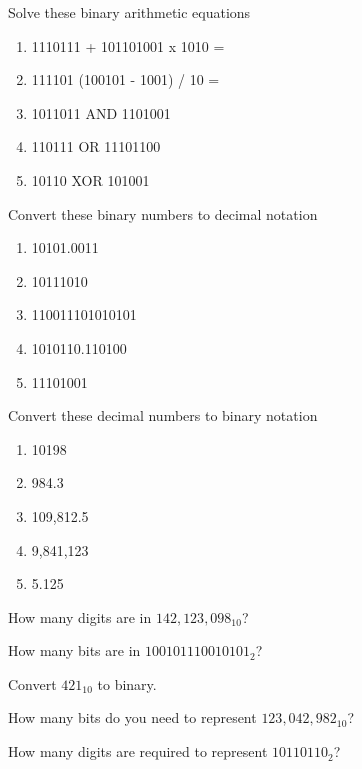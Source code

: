 \begin{exercise}
Solve these binary arithmetic equations
\begin{enumerate}
\item 1110111 + 101101001 x 1010 =
\item 111101 (100101 - 1001) / 10 =
\item 1011011 AND 1101001
\item 110111 OR 11101100
\item 10110 XOR 101001
\end{enumerate}
\end{exercise}

\begin{exercise}
Convert these binary numbers to decimal notation
\begin{enumerate}
\item 10101.0011
\item 10111010
\item 110011101010101
\item 1010110.110100
\item 11101001
\end{enumerate}
\end{exercise}

\begin{exercise}
Convert these decimal numbers to binary notation
\begin{enumerate}
\item 10198
\item 984.3
\item 109,812.5
\item 9,841,123
\item 5.125
\end{enumerate}
\end{exercise}

\begin{exercise}
How many digits are in $142,123,098_{10}$?
\end{exercise}

\begin{exercise}
How many bits are in $100101110010101_2$?
\end{exercise}

\begin{exercise}
Convert $421_{10}$ to binary.
\end{exercise}

\begin{exercise}
How many bits do you need to represent $123,042,982_{10}$?
\end{exercise}

\begin{exercise}
How many digits are required to represent $10110110_2$?
\end{exercise}